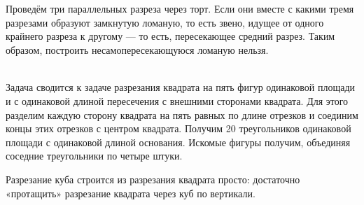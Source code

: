 \begin{itemize}

\itA Проведём три параллельных разреза через торт. Если они вместе с какими тремя разрезами образуют замкнутую ломаную, то есть звено, идущее от одного крайнего разреза к другому — то есть, пересекающее средний разрез. Таким образом, построить несамопересекающуюся ломаную нельзя.

\itB $\phantom{x}$
\vspace{-0.5cm}
\begin{center}\end{center}
\vspace{0.2cm}

\itC Задача сводится к задаче разрезания квадрата на пять фигур одинаковой площади и с одинаковой длиной пересечения с внешними сторонами квадрата. Для этого разделим каждую сторону квадрата на пять равных по длине отрезков и соединим концы этих отрезков с центром квадрата. Получим 20 треугольников одинаковой площади с одинаковой длиной основания. Искомые фигуры получим, объединяя соседние треугольники по четыре штуки.

Разрезание куба строится из разрезания квадрата просто: достаточно «протащить» разрезание квадрата через куб по вертикали.
\end{itemize}